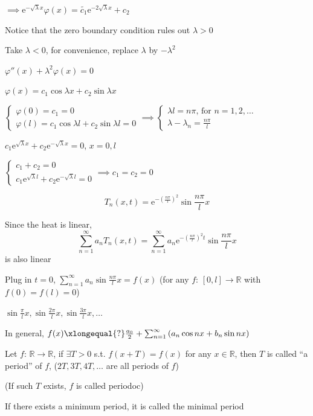 $\implies\mathrm{e}^{-\sqrt{\lambda}x}\varphi(x)=\tilde{c_1}\mathrm{e}^{-2\sqrt{\lambda}x}+c_2$

Notice that the zero boundary condition rules out $\lambda>0$

Take $\lambda<0$, for convenience, replace $\lambda$ by $-\lambda^2$

$\varphi''(x)+\lambda^2\varphi(x)=0$

$\varphi(x)=c_1\cos\lambda x+c_2\sin\lambda x$

$\begin{cases}
        \varphi(0)=c_1=0 \\
        \varphi(l)=c_1\cos\lambda l+c_2\sin\lambda l=0
    \end{cases}\implies\begin{cases}
        \lambda l=n\pi\text{, for }n=1,2,\dots \\
        \lambda-\lambda_n=\frac{n\pi}{l}
    \end{cases}$

$c_1\mathrm{e}^{\sqrt{\lambda}x}+c_2\mathrm{e}^{-\sqrt{\lambda}x}=0$, $x=0,l$

$\begin{cases}
        c_1+c_2=0 \\
        c_1\mathrm{e}^{\sqrt{\lambda}l}+c_2\mathrm{e}^{-\sqrt{\lambda}l}=0
    \end{cases}\implies c_1=c_2=0$

$$\boxed{T_n(x,t)}=\mathrm{e}^{-\left(\frac{n\pi}{l}\right)^2}\sin\frac{n\pi}{l}x$$

Since the heat is linear,
$$\sum_{n=1}^{\infty}a_nT_n(x,t)=\sum_{n=1}^{\infty}a_n\mathrm{e}^{-\left(\frac{n\pi}{l}\right)^2t}\sin\frac{n\pi}{l}x$$
is also linear

Plug in $t=0$, $\sum_{n=1}^{\infty}a_n\sin\frac{n\pi}{l}x=f(x)$ (for any $f:\,[0,l]\to\mathbb{R}$ with $f(0)=f(l)=0$)

$\sin\frac{\pi}{l}x,\sin\frac{2\pi}{l}x,\sin\frac{3\pi}{l}x,\dots$

In general, $f(x)\xlongequal{?}\frac{a_0}{2}+\sum_{n=1}^{\infty}\left(a_n\cos nx+b_n\sin nx\right)$

\begin{definition}
    Let $f:\,\mathbb{R}\to\mathbb{R}$, if $\exists T>0$ s.t. $f(x+T)=f(x)$ for any $x\in\mathbb{R}$, then $T$ is called ``a period'' of $f$, ($2T,3T,4T,\dots$ are all periods of $f$)

    (If such $T$ exists, $f$ is called periodoc)

    If there exists a minimum period, it is called the minimal period
\end{definition}

